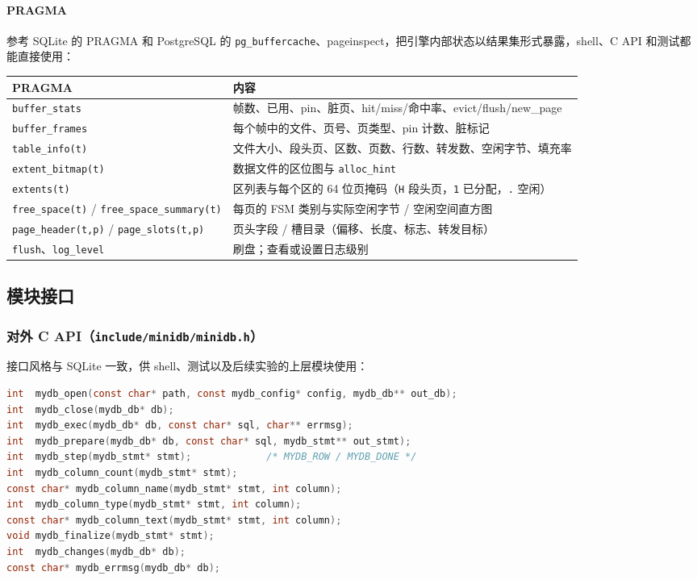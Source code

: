 \documentclass[11pt,a4paper]{ctexart}
\newcommand{\code}[1]{\texttt{#1}}
\begin{document}
\paragraph{PRAGMA} 参考 SQLite 的 PRAGMA 和 PostgreSQL 的 \code{pg\_buffercache}、pageinspect，把引擎内部状态以结果集形式暴露，shell、C API 和测试都能直接使用：

\begin{table}[H]
  \centering
  \small
  \begin{tabularx}{\textwidth}{l X}
    \toprule
    PRAGMA & 内容 \\
    \midrule
    \code{buffer\_stats} & 帧数、已用、pin、脏页、hit/miss/命中率、evict/flush/new\_page \\
    \code{buffer\_frames} & 每个帧中的文件、页号、页类型、pin 计数、脏标记 \\
    \code{table\_info(t)} & 文件大小、段头页、区数、页数、行数、转发数、空闲字节、填充率 \\
    \code{extent\_bitmap(t)} & 数据文件的区位图与 \code{alloc\_hint} \\
    \code{extents(t)} & 区列表与每个区的 64 位页掩码（\code{H} 段头页，\code{1} 已分配，\code{.} 空闲） \\
    \code{free\_space(t)} / \code{free\_space\_summary(t)} & 每页的 FSM 类别与实际空闲字节 / 空闲空间直方图 \\
    \code{page\_header(t,p)} / \code{page\_slots(t,p)} & 页头字段 / 槽目录（偏移、长度、标志、转发目标） \\
    \code{flush}、\code{log\_level} & 刷盘；查看或设置日志级别 \\
    \bottomrule
  \end{tabularx}
\end{table}

\subsection{模块接口}

\subsubsection{对外 C API（\code{include/minidb/minidb.h}）}

接口风格与 SQLite 一致，供 shell、测试以及后续实验的上层模块使用：

\begin{lstlisting}[language=C]
int  mydb_open(const char* path, const mydb_config* config, mydb_db** out_db);
int  mydb_close(mydb_db* db);
int  mydb_exec(mydb_db* db, const char* sql, char** errmsg);
int  mydb_prepare(mydb_db* db, const char* sql, mydb_stmt** out_stmt);
int  mydb_step(mydb_stmt* stmt);             /* MYDB_ROW / MYDB_DONE */
int  mydb_column_count(mydb_stmt* stmt);
const char* mydb_column_name(mydb_stmt* stmt, int column);
int  mydb_column_type(mydb_stmt* stmt, int column);
const char* mydb_column_text(mydb_stmt* stmt, int column);
void mydb_finalize(mydb_stmt* stmt);
int  mydb_changes(mydb_db* db);
const char* mydb_errmsg(mydb_db* db);
\end{lstlisting}
\end{document}
